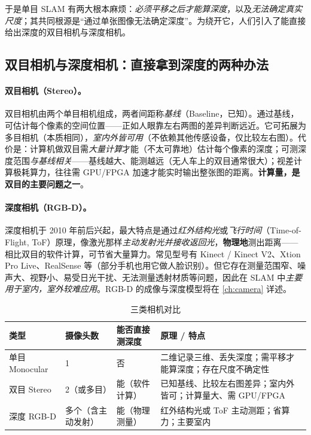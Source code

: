 \noindent 于是单目 SLAM 有两大根本麻烦：\emph{必须平移之后才能算深度}，以及\emph{无法确定真实尺度}；其共同根源是“通过单张图像无法确定深度”。为绕开它，人们引入了能直接给出深度的双目相机与深度相机。

\subsection{双目相机与深度相机：直接拿到深度的两种办法}
\label{sec:intro-stereo-rgbd}
\paragraph{双目相机（Stereo）。}
双目相机由两个单目相机组成，两者间距称\emph{基线}（Baseline，已知）。通过基线，可估计每个像素的空间位置——正如人眼靠左右两图的差异判断远近\cite{gaoxiang2019slam14}。它可拓展为多目相机（本质相同），\emph{室内外皆可用}（不依赖其他传感设备，仅比较左右图）。代价是：计算机做双目需\emph{大量计算}才能（不太可靠地）估计每个像素的深度；可测深度范围\emph{与基线相关}——基线越大、能测越远（无人车上的双目通常很大）；视差计算极耗算力，往往需 GPU/FPGA 加速才能实时输出整张图的距离。\textbf{计算量，是双目的主要问题之一}。

\paragraph{深度相机（RGB-D）。}
深度相机于 2010 年前后兴起，最大特点是通过\emph{红外结构光}或\emph{飞行时间}（Time-of-Flight, ToF）原理，像激光那样\emph{主动发射光并接收返回光}，\textbf{物理地}测出距离——相比双目的软件计算，可节省大量算力\cite{gaoxiang2019slam14}。常见型号有 Kinect / Kinect V2、Xtion Pro Live、RealSense 等（部分手机也用它做人脸识别）。但它存在测量范围窄、噪声大、视野小、易受日光干扰、无法测量透射材质等问题，因此在 SLAM 中\emph{主要用于室内，室外较难应用}。RGB-D 的成像与深度模型将在 \cref{ch:camera} 详述。

\begin{table}[H]\centering\small
\caption{三类相机对比}
\label{tab:intro-cameras}
\begin{tabular}{p{} p{} p{} p{}}
\toprule
类型 & 摄像头数 & 能否直接测深度 & 原理 / 特点 \\
\midrule
单目 Monocular & 1 & 否 & 二维记录三维、丢失深度；需平移才能算深度；存在尺度不确定性 \\
双目 Stereo & 2（或多目） & 能（软件计算） & 已知基线、比较左右图差异；室内外皆可；计算量大、需 GPU/FPGA \\
深度 RGB-D & 多个（含主动发射） & 能（物理测量） & 红外结构光或 ToF 主动测距；省算力；主要室内 \\
\bottomrule
\end{tabular}
\end{table}

